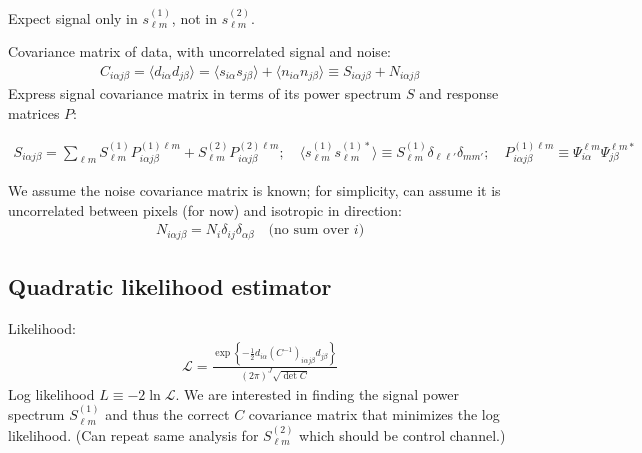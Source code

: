 \documentclass[prd,aps,10pt,nofootinbib,twocolumn,superscriptaddress,preprintnumbers,balancelastpage,longbibliography]{revtex4-1}
\newcommand{\Cinv}{(C^{-1})}
\begin{document}
Expect signal only in $s_{\ell m}^{(1)}$, not in $s_{\ell m}^{(2)}$.

Covariance matrix of data, with uncorrelated signal and noise:
\begin{align}
C_{i\alpha j \beta} = \langle d_{i \alpha} d_{j \beta} \rangle = \langle s_{i \alpha} s_{j \beta} \rangle + \langle n_{i \alpha} n_{j \beta} \rangle \equiv S_{i \alpha j \beta} + N_{i \alpha j \beta}
\end{align}
Express signal covariance matrix in terms of its power spectrum $S$ and response matrices $P$:
\begin{widetext}
\begin{align}
S_{i \alpha j \beta} = \sum_{\ell m} S^{(1)}_{\ell m} P_{i \alpha j \beta}^{(1) \ell m } + S^{(2)}_{\ell m} P_{i \alpha j \beta}^{(2) \ell m }; \quad \langle s^{(1)}_{\ell m} s^{(1)*}_{\ell m} \rangle \equiv S^{(1)}_{\ell m} \delta_{\ell \ell'} \delta_{m m'}; \quad P_{i \alpha j \beta}^{(1) \ell m } \equiv \Psi_{i \alpha}^{\ell m} \Psi_{j \beta}^{\ell m *}
\end{align}
\end{widetext}

We assume the noise covariance matrix is known; for simplicity, can assume it is uncorrelated between pixels (for now) and isotropic in direction:
\begin{align}
N_{i \alpha j \beta} = N_i \delta_{ij} \delta_{\alpha \beta} \quad \text{(no sum over $i$)} \label{eq:Ndiagonal}
\end{align}

\subsection{Quadratic likelihood estimator}
Likelihood:
\begin{align}
\mathcal{L} = \frac{\exp\left\lbrace -\frac{1}{2} d_{i \alpha} \Cinv_{i \alpha j \beta} d_{j \beta} \right\rbrace}{(2\pi)^J \sqrt{\det C}}
\end{align}
Log likelihood $L \equiv - 2 \ln \mathcal{L}$. We are interested in finding the signal power spectrum $S^{(1)}_{\ell m}$ and thus the correct $C$ covariance matrix that minimizes the log likelihood. (Can repeat same analysis for $S^{(2)}_{\ell m}$ which should be control channel.)
\end{document}
